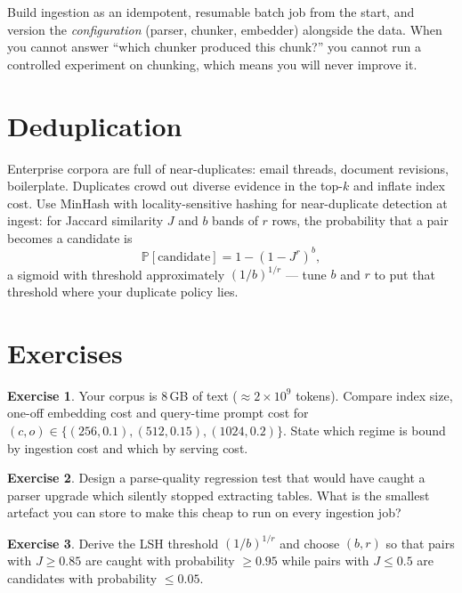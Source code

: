 \documentclass[11pt,twoside,openright]{book}
\theoremstyle{definition}
\newtheorem{exercise}{Exercise}[chapter]
\theoremstyle{plain}
\theoremstyle{remark}
\newcommand{\Prob}{\mathbb{P}}
\begin{document}
\begin{practice}
Build ingestion as an idempotent, resumable batch job from the start, and
version the \emph{configuration} (parser, chunker, embedder) alongside the data.
When you cannot answer ``which chunker produced this chunk?'' you cannot run a
controlled experiment on chunking, which means you will never improve it.
\end{practice}

\section{Deduplication}

Enterprise corpora are full of near-duplicates: email threads, document
revisions, boilerplate. Duplicates crowd out diverse evidence in the top-$k$ and
inflate index cost. Use MinHash with locality-sensitive hashing for near-duplicate
detection at ingest: for Jaccard similarity $J$ and $b$ bands of $r$ rows, the
probability that a pair becomes a candidate is
\begin{equation}
  \Prob[\text{candidate}] = 1-(1-J^{r})^{b},
\end{equation}
a sigmoid with threshold approximately $(1/b)^{1/r}$ --- tune $b$ and $r$ to put
that threshold where your duplicate policy lies.

\section{Exercises}

\begin{exercise}
Your corpus is $8$\,GB of text ($\approx 2\times 10^{9}$ tokens). Compare index
size, one-off embedding cost and query-time prompt cost for
$(c,o) \in \{(256,0.1),(512,0.15),(1024,0.2)\}$. State which regime is bound by
ingestion cost and which by serving cost.
\end{exercise}

\begin{exercise}
Design a parse-quality regression test that would have caught a parser upgrade
which silently stopped extracting tables. What is the smallest artefact you can
store to make this cheap to run on every ingestion job?
\end{exercise}

\begin{exercise}
Derive the LSH threshold $(1/b)^{1/r}$ and choose $(b,r)$ so that pairs with
$J\ge 0.85$ are caught with probability $\ge 0.95$ while pairs with $J\le 0.5$
are candidates with probability $\le 0.05$.
\end{exercise}
\end{document}
